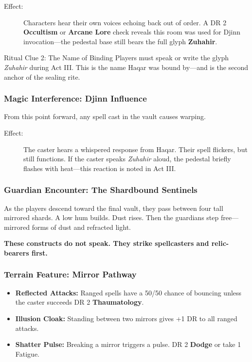 \begin{description}
    \item[Effect:] Characters hear their own voices echoing back out of order. A DR 2 \textbf{Occultism} or \textbf{Arcane Lore} check reveals this room was used for Djinn invocation—the pedestal base still bears the full glyph \textbf{Zuhahir}.
\end{description}

\begin{CommentBox}{Ritual Clue 2: The Name of Binding}
    Players must speak or write the glyph \textit{Zuhahir} during Act III. This is the name Haqar was bound by—and is the second anchor of the sealing rite.
\end{CommentBox}

\subsubsection*{Magic Interference: Djinn Influence}

From this point forward, any spell cast in the vault causes warping.

\begin{description}
    \item[Effect:] The caster hears a whispered response from Haqar. Their spell flickers, but still functions. If the caster speaks \textit{Zuhahir} aloud, the pedestal briefly flashes with heat—this reaction is noted in Act III.
\end{description}

\subsubsection*{Guardian Encounter: The Shardbound Sentinels}

As the players descend toward the final vault, they pass between four tall mirrored shards. A low hum builds. Dust rises. Then the guardians step free—mirrored forms of dust and refracted light.

\textbf{These constructs do not speak. They strike spellcasters and relic-bearers first.}

\subsubsection*{Terrain Feature: Mirror Pathway}

\begin{itemize}
    \item \textbf{Reflected Attacks:} Ranged spells have a 50/50 chance of bouncing unless the caster succeeds DR 2 \textbf{Thaumatology}.
    \item \textbf{Illusion Cloak:} Standing between two mirrors gives +1 DR to all ranged attacks.
    \item \textbf{Shatter Pulse:} Breaking a mirror triggers a pulse. DR 2 \textbf{Dodge} or take 1 Fatigue.
\end{itemize}

